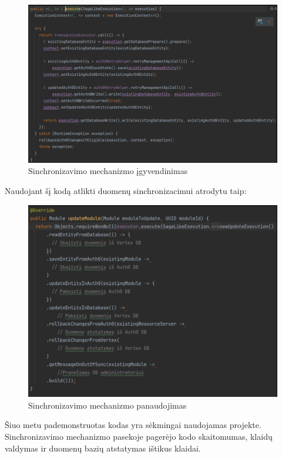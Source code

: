\documentclass{VUMIFPSkursinis}
\begin{document}
			\begin{figure}[H]
			\includegraphics[scale=0.5]{img/six}
			\caption{Sinchronizavimo mechanizmo įgyvendinimas} %
			\label{img:kurimoProcesas}
			\end{figure}

		Naudojant šį kodą atlikti duomenų sinchronizacimui atrodytu taip:

			\begin{figure}[H]
			\includegraphics[scale=0.7]{img/seven}
			\caption{Sinchronizavimo mechanizmo panaudojimas} %
			\label{img:kurimoProcesas}
			\end{figure}

		Šiuo metu pademonstruotas kodas yra sėkmingai naudojamas projekte.
		Sinchronizavimo mechanizmo pasekoje pagerėjo kodo skaitomumas, klaidų valdymas ir duomenų bazių atstatymas ištikus klaidai.
		
\end{document}
